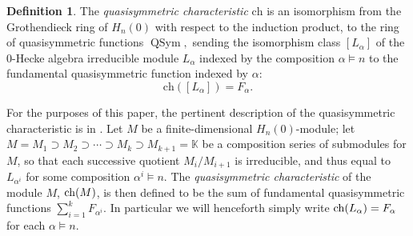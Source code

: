 \documentclass[12pt,letterpaper]{amsart}
\theoremstyle{definition}
\newtheorem{definition}[theorem]{Definition}
\DeclareMathOperator{\QSym}{QSym}
\newcommand{\hn}{H_n(0)}
\begin{document}
\begin{definition}\cite{DKLT1996, KrobThibon1997}
The \textit{quasisymmetric characteristic} $\mathrm{ch}$ is an isomorphism from the Grothendieck ring of $H_n(0)$ with respect to the induction product, to the ring of quasisymmetric functions $\QSym,$ sending the isomorphism  class $[L_\alpha]$ of 
the 0-Hecke algebra irreducible module $L_\alpha$ indexed by the composition $\alpha\vDash n$  to 
the fundamental quasisymmetric function indexed by $\alpha$:
\[ \mathrm{ch}([L_\alpha])= F_\alpha.\]

For the purposes of this paper, the pertinent  description of the quasisymmetric characteristic is in \cite[Section 5.4]{KrobThibon1997}. Let $M$ be a finite-dimensional $\hn$-module;  let $M=M_1\supset M_2\supset \cdots \supset M_k\supset M_{k+1}=\mathbb{K}$ be a composition series of submodules for $M$, so that   each successive quotient $M_i/M_{i+1}$ is irreducible, and thus equal to $L_{\alpha^i}$ for some composition $\alpha^i\vDash n$. The \emph{quasisymmetric characteristic} of the module $M$, $\operatorname{\mathrm{ch}}(M)$, is then defined to be  the sum of fundamental quasisymmetric functions  $\sum_{i=1}^k F_{\alpha^i}$.
In particular we will henceforth simply  write $\operatorname{\mathrm{ch}}(L_\alpha)=F_\alpha$ for each $\alpha\vDash n$.
\end{definition}
\end{document}
